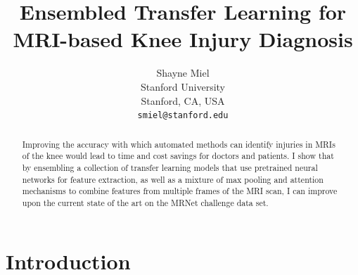 \documentclass[10pt,twocolumn,letterpaper]{article}
\begin{document}
\title{Ensembled Transfer Learning for MRI-based Knee Injury Diagnosis}

\author{Shayne Miel\\
Stanford University\\
Stanford, CA, USA\\
{\tt\small smiel@stanford.edu}
}

\maketitle

\begin{abstract}
   Improving the accuracy with which automated methods can identify injuries in
   MRIs of the knee would lead to time and cost savings for doctors and patients.
   I show that by ensembling a collection of transfer learning models that use pretrained neural networks for feature extraction, as well as a mixture of max pooling and attention mechanisms to combine features from multiple
   frames of the MRI scan, I can improve upon the current state of the art on
   the MRNet challenge data set.
\end{abstract}

\section{Introduction} %
\end{document}
